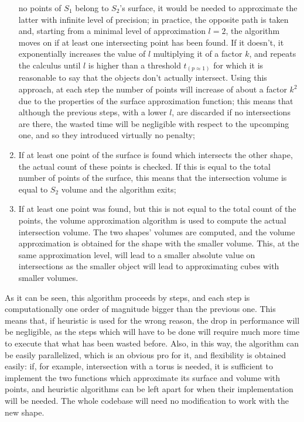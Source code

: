 \begin{enumerate}
{    no points of $S_1$ belong to $S_2$'s surface, it
    would be needed to approximate the latter with infinite level of
    precision; in practice, the opposite path is taken and, starting
    from a minimal level of approximation  $l=2$, the algorithm moves
    on if at least one intersecting point has been found. If it
    doesn't, it exponentially increases the value of $l$ multiplying
    it of a factor $k$, and repeats
    the calculus until $l$ is higher than a threshold
    $t_{(p\approx 1)}$ for which it is reasonable to say that the
    objects don't actually intersect. Using this approach, at each
    step the number of points will increase of about a factor $k^2$
    due to the properties of the surface approximation function; this
    means that although the previous steps, with a lower $l$, are
    discarded if no intersections are there, the wasted time will be
    negligible with respect to the upcomping one, and so they introduced virtually no penalty;}
  \item{If at least one point of the surface is found which intersects
    the other shape, the actual count of these points is checked. If
    this is equal to the total number of points of the surface,
    this means that the intersection volume is equal to $S_2$ volume
    and the algorithm exits;}
  \item{If at least one point was found, but this is not equal to the
    total count of the points, the volume approximation algorithm is used to compute the
    actual intersection volume. The two shapes' volumes are computed,
    and the volume approximation is obtained for the shape with the
    smaller volume. This, at the same approximation level, will lead
    to a smaller absolute value on intersections as the smaller object
    will lead to approximating cubes with smaller volumes.}
\end{enumerate}

As it can be seen, this algorithm proceeds by steps, and each step is
computationally one order of magnitude bigger than the previous
one. This means that, if heuristic is used for the wrong reason, the
drop in performance will be negligible, as the steps which will have
to be done will require much more time to execute that what has been
wasted before. Also, in this way, the algorithm can be easily
parallelized, which is an obvious pro for it, and flexibility is
obtained easily: if, for example, intersection with a torus is needed,
it is sufficient to implement the two functions which approximate its
surface and volume with points, and heuristic algorithms can be left
apart for when their implementation will be needed. The whole codebase
will need no modification to work with the new shape.

